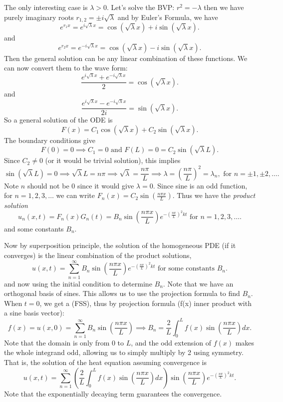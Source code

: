 \documentclass[class=article,crop=false]{standalone}
\begin{document}
The only interesting case is $ \lambda >0$. Let's solve the BVP:
$ r^2 = -\lambda$ then we have purely imaginary roots $ r_{1,2}=\pm i \sqrt{\lambda} $ and by Euler's Formula, we have
\[
	e^{r_1 x} = e^{i \sqrt{\lambda} x }= \cos( \sqrt{\lambda} x)+ i \sin(\sqrt{\lambda} x )
.\] 
and
\[
e^{r_2 x} =e^{-i \sqrt{\lambda}x }= \cos(\sqrt{\lambda}x  ) - i\sin(\sqrt{\lambda}x  )
.\]
Then the general solution can be any linear combination of these functions. We can now convert them to the wave form:
\[
\frac{e^{i\sqrt{\lambda} x}+e^{-i\sqrt{\lambda} x}}{2}= \cos(\sqrt{\lambda} x )
.\] 
and
\[
\frac{e^{i\sqrt{\lambda} x}- e^{-i\sqrt{\lambda} x}}{2i} = \sin(\sqrt{\lambda}x  )
.\] 
So a general solution of the ODE is
\[
	F(x) = C_1 \cos(\sqrt{ \lambda} x ) + C_2 \sin(\sqrt{\lambda} x )
.\] 
The boundary conditions give
\[
	F(0) = 0 \implies C_1 = 0 \text{ and } F(L)=0 = C_2 \sin(\sqrt{\lambda}L  ) 
.\] 
Since $ C_2 \neq 0$ (or it would be trivial solution), this implies
\[
	\sin(\sqrt{\lambda} L ) = 0 \implies \sqrt{\lambda}L = n \pi \implies \sqrt{\lambda} =\frac{n \pi}{L} \implies \lambda = \left( \frac{n\pi}{L} \right)^2  = \lambda_n, \text{ for } n=\pm 1,\pm 2,\ldots   
.\]
Note $ n$ should not be 0 since it would give $\lambda =0 $. Since sine is an odd function, for $ n = 1,2,3,\ldots $ we can write $ F_n(x) = C_2 \sin(\frac{n\pi x}{L} )$. Thus we have the \emph{product solution}
\[
	u_n(x,t)=F_n(x)G_n(t)=B_n \sin \left( \frac{ n\pi x}{ L} \right) e^{-\left( \frac{n\pi}{L} \right)^2 kt} \text{ for } n=1,2,3,\ldots 
.\] 
and some constants $ B_n$. 

Now by superposition principle, the solution of the homogeneous PDE (if it converges) is the linear combination of the product solutions,
\[
	u(x,t)=\sum_{ n= 1}^{\infty} B_n \sin \left( \frac{ n\pi x}{ L} \right) e^{-\left( \frac{n\pi}{L} \right)^2 kt} \text{ for some constants } B_n 
.\] 
and now using the initial condition to determine $ B_n$. Note that we have an orthogonal basis of sines. This allows us to use the projection formula to find $ B_n$. When $ t=0$, we get a   (FSS), thus by projection formula (f(x) inner product with a sine basis vector):
\[
	f(x)=u(x,0)=\sum_{ n= 1}^{\infty} B_n \sin \left( \frac{ n\pi x}{ L} \right) \implies B_n = \frac{2}{L} \int_{0}^{L} f(x) \sin \left( \frac{ n\pi x}{ L} \right) dx
.\]
Note that the domain is only from 0 to $ L$, and the odd extension of $f(x)$ makes the whole integrand odd, allowing us to simply multiply by 2 using symmetry. That is, the solution of the heat equation assuming convergence is
\[
	u(x,t)=\sum_{ n= 1}^{\infty} \left( \frac{2}{L} \int_{0}^{L} f(x) \sin \left( \frac{ n\pi x}{ L} \right) dx  \right) \sin \left( \frac{ n\pi x}{ L} \right) e^{-\left( \frac{n\pi}{L} \right)^2 kt }
.\]
Note that the exponentially decaying term guarantees the convergence. 
\end{document}
